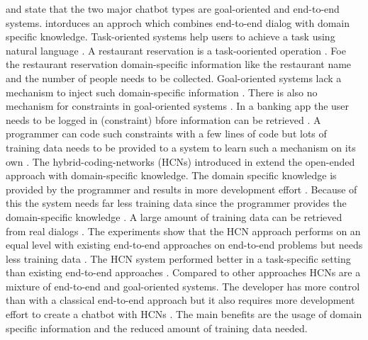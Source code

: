 \citet{williams2017hybrid} and \citet{bordes2016learning} state that the two major chatbot types are goal-oriented and end-to-end systems.
\citet{williams2017hybrid} intorduces an approch which combines end-to-end dialog with domain specific knowledge.
Task-oriented systems help users to achieve a task using natural language \cite{williams2017hybrid}.
A restaurant reservation is a task-ooriented operation \cite{williams2017hybrid}.
Foe the restaurant reservation domain-specific information like the restaurant name and the number of people
needs to be collected.
Goal-oriented systems lack a mechanism to inject such domain-specific information \citet{williams2017hybrid}.
There is also no mechanism for constraints in goal-oriented systems \cite{williams2017hybrid}.
In a banking app the user needs to be logged in (constraint) bfore information can be retrieved \cite{williams2017hybrid}.
A programmer can code such constraints with a few lines of code but lots of training data needs to be provided 
to a system to learn such a mechanism on its own \cite{williams2017hybrid}.
The hybrid-coding-networks (HCNs) introduced in \citet{williams2017hybrid} extend the open-ended approach 
with domain-specific knowledge. 
The domain specific knowledge is provided by the programmer and results in more development effort \cite{williams2017hybrid}.
Because of this the system needs far less training data since the programmer provides the domain-specific knowledge \cite{williams2017hybrid}.
A large amount of training data can be retrieved from real dialogs \cite{williams2017hybrid}.
The experiments show that the HCN approach performs on an equal level with 
existing end-to-end approaches on end-to-end problems but needs less training data \cite{williams2017hybrid}. 
The HCN system performed better in a task-specific setting than existing end-to-end approaches \cite{williams2017hybrid}.
Compared to other approaches HCNs are a mixture of end-to-end and goal-oriented systems.
The developer has more control than with a classical end-to-end approach but 
it also requires more development effort to create a chatbot with HCNs \cite{williams2017hybrid}.
The main benefits are the usage of domain specific information and the reduced amount of training data needed.

